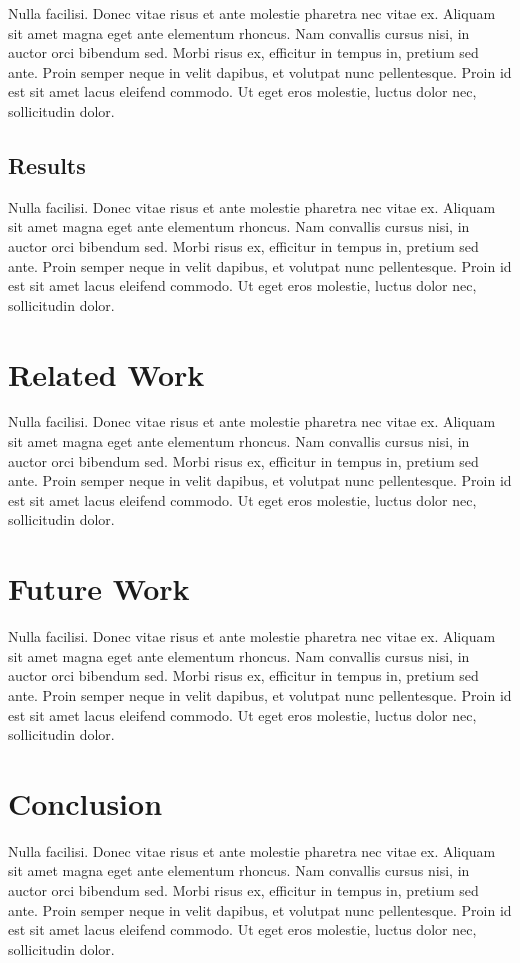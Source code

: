 \documentclass[sigconf,nonacm]{acmart}
\begin{document}
Nulla facilisi. Donec vitae risus et ante molestie pharetra nec vitae ex. Aliquam sit amet magna eget ante elementum rhoncus. Nam convallis cursus nisi, in auctor orci bibendum sed. Morbi risus ex, efficitur in tempus in, pretium sed ante. Proin semper neque in velit dapibus, et volutpat nunc pellentesque. Proin id est sit amet lacus eleifend commodo. Ut eget eros molestie, luctus dolor nec, sollicitudin dolor.

\subsection{Results}

Nulla facilisi. Donec vitae risus et ante molestie pharetra nec vitae ex. Aliquam sit amet magna eget ante elementum rhoncus. Nam convallis cursus nisi, in auctor orci bibendum sed. Morbi risus ex, efficitur in tempus in, pretium sed ante. Proin semper neque in velit dapibus, et volutpat nunc pellentesque. Proin id est sit amet lacus eleifend commodo. Ut eget eros molestie, luctus dolor nec, sollicitudin dolor.

\section{Related Work}

Nulla facilisi. Donec vitae risus et ante molestie pharetra nec vitae ex. Aliquam sit amet magna eget ante elementum rhoncus. Nam convallis cursus nisi, in auctor orci bibendum sed. Morbi risus ex, efficitur in tempus in, pretium sed ante. Proin semper neque in velit dapibus, et volutpat nunc pellentesque. Proin id est sit amet lacus eleifend commodo. Ut eget eros molestie, luctus dolor nec, sollicitudin dolor.

\section{Future Work}

Nulla facilisi. Donec vitae risus et ante molestie pharetra nec vitae ex. Aliquam sit amet magna eget ante elementum rhoncus. Nam convallis cursus nisi, in auctor orci bibendum sed. Morbi risus ex, efficitur in tempus in, pretium sed ante. Proin semper neque in velit dapibus, et volutpat nunc pellentesque. Proin id est sit amet lacus eleifend commodo. Ut eget eros molestie, luctus dolor nec, sollicitudin dolor.

\section{Conclusion}

Nulla facilisi. Donec vitae risus et ante molestie pharetra nec vitae ex. Aliquam sit amet magna eget ante elementum rhoncus. Nam convallis cursus nisi, in auctor orci bibendum sed. Morbi risus ex, efficitur in tempus in, pretium sed ante. Proin semper neque in velit dapibus, et volutpat nunc pellentesque. Proin id est sit amet lacus eleifend commodo. Ut eget eros molestie, luctus dolor nec, sollicitudin dolor.



\end{document}

